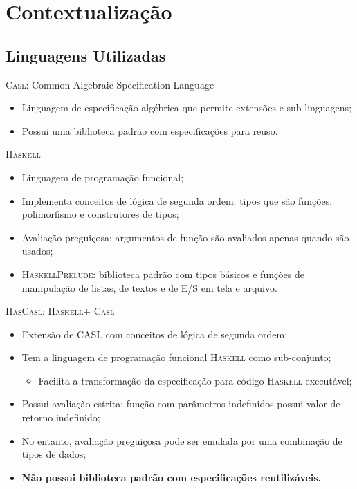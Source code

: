 \documentclass{beamer}
\newcommand{\HasCASL}{\textsc{HasCasl}\xspace}
\newcommand{\CASL}{\textsc{Casl}\xspace}
\newcommand{\Haskell}{\textsc{Haskell}\xspace}
\newcommand{\Prelude}{\textsc{Prelude}\xspace}
\begin{document}
\section{Contextualização}

\subsection{Linguagens Utilizadas}

\begin{frame}	
\begin{block}{\CASL: Common Algebraic Specification Language}
	\begin{itemize}
		\item Linguagem de especificação algébrica que permite extensões e sub-linguagens;
		\item Possui uma biblioteca padrão com especificações para reuso.
	\end{itemize}
\end{block}

\begin{block}{\Haskell}
	\begin{itemize}
		\item Linguagem de programação funcional;
		\item Implementa conceitos de lógica de segunda ordem: tipos que são funções, polimorfismo e construtores de tipos;
		\item Avaliação preguiçosa: argumentos de função são avaliados apenas quando são usados;
		\item \Haskell \Prelude: biblioteca padrão com tipos básicos e funções de manipulação de listas, de textos e de E/S em tela e arquivo.
	\end{itemize}
\end{block}
\end{frame}

\begin{frame}

\begin{block}{\HasCASL: \Haskell + \CASL}
	\begin{itemize}
		\item Extensão de CASL com conceitos de lógica de segunda ordem;
		\item Tem a linguagem de programação funcional \Haskell como sub-conjunto;
			\begin{itemize}
				\item Facilita a transformação da especificação para código \Haskell executável;
			\end{itemize}
		\item Possui avaliação estrita: função com parâmetros indefinidos possui valor de retorno indefinido;
		\item No entanto, avaliação preguiçosa pode ser emulada por uma combinação de tipos de dados;
		\item \textbf{Não possui biblioteca padrão com especificações reutilizáveis.}
	\end{itemize}
\end{block}
\end{frame}
\end{document}

